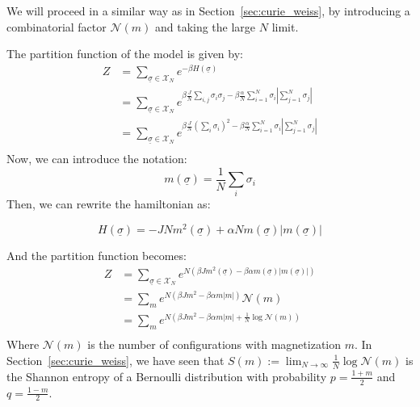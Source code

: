 We will proceed in a similar way as in Section~\ref{sec:curie_weiss}, by introducing a combinatorial factor $\mathcal{N}(m)$ and taking the large $N$ limit.

The partition function of the model is given by:
\begin{equation}
    \begin{aligned}
        Z &= \sum_{\underline{\sigma}\in\mathcal{X}_N}e^{-\beta H(\underline{\sigma})}\\
        &= \sum_{\underline{\sigma}\in\mathcal{X}_N}e^{\beta\frac{J}{N}\sum_{i,j}\sigma_i\sigma_j  - \beta\frac{\alpha}{N}\sum_{i=1}^N \sigma_i \left | \sum_{j=1}^N \sigma_j \right |}\\
        &= \sum_{\underline{\sigma}\in\mathcal{X}_N}e^{\beta\frac{J}{N}\left(\sum_{i}\sigma_i\right)^2 - \beta\frac{\alpha}{N}\sum_{i=1}^N \sigma_i \left | \sum_{j=1}^N \sigma_j \right |}\\
    \end{aligned}
\end{equation}
Now, we can introduce the notation:
\begin{equation}
m(\underline{\sigma}) = \frac{1}{N}\sum_{i}\sigma_i
\end{equation}
Then, we can rewrite the hamiltonian as:

\begin{equation}
    H(\underline{\sigma}) =  - J N m^2(\underline{\sigma}) + \alpha N m(\underline{\sigma}) \left| m(\underline{\sigma}) \right|
\end{equation}

And the partition function becomes:
\begin{equation}
    \begin{aligned}
        Z &= \sum_{\underline{\sigma}\in\mathcal{X}_N}e^{N\left(\beta J  m^2(\underline{\sigma})-\beta \alpha  m(\underline{\sigma}) \left| m(\underline{\sigma})\right|\right)}\\
        &= \sum_{m}e^{N\left(\beta J  m^2-\beta \alpha  m \left| m\right|\right)}\mathcal{N}(m)\\
        &= \sum_{m}e^{N\left(\beta J  m^2-\beta \alpha  m \left| m\right| + \frac{1}{N}\log \mathcal{N}(m)\right)}\\
    \end{aligned}
\end{equation}
Where $\mathcal{N}(m)$ is the number of configurations with magnetization $m$. In Section~\ref{sec:curie_weiss}, we have seen that $S(m) :=\lim_{N\rightarrow\infty}\frac{1}{N}\log \mathcal{N}(m)$ is the Shannon entropy of a Bernoulli distribution with probability $p = \frac{1+m}{2}$ and $q = \frac{1-m}{2}$.

